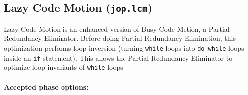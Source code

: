 \documentclass{article}
\begin{document}
\subsection{Lazy Code Motion ({\tt jop.lcm})}

Lazy Code Motion is an enhanced version of Busy Code Motion, a
Partial Redundancy Eliminator. Before doing Partial Redundancy Elimination,
this optimization performs loop inversion (turning {\tt while} loops
into {\tt do while} loops inside an {\tt if} statement).
This allows the Partial Redundancy Eliminator
to optimize loop invariants of {\tt while} loops.


\paragraph{Accepted phase options:} 
\end{document}
